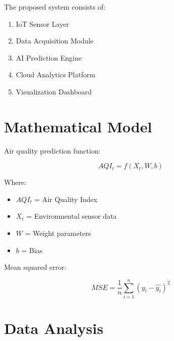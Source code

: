 \documentclass[12pt,a4paper]{article}
\begin{document}
	The proposed system consists of:
	
	\begin{enumerate}
		
		\item IoT Sensor Layer
		
		\item Data Acquisition Module
		
		\item AI Prediction Engine
		
		\item Cloud Analytics Platform
		
		\item Visualization Dashboard
		
	\end{enumerate}
	
	
	\section{Mathematical Model}
	
	Air quality prediction function:
	
	\[
	AQI_t = f(X_t,W,b)
	\]
	
	Where:
	
	\begin{itemize}
		
		\item $AQI_t$ = Air Quality Index
		
		\item $X_t$ = Environmental sensor data
		
		\item $W$ = Weight parameters
		
		\item $b$ = Bias
		
	\end{itemize}
	
	Mean squared error:
	
	\[
	MSE = \frac{1}{n}\sum_{i=1}^{n}(y_i - \hat{y_i})^2
	\]
	
	
	\section{Data Analysis}
	
\end{document}
